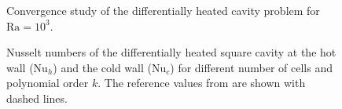 \begin{figure}[tb]
	\centering
	\pgfplotsset{width=0.34\textwidth, compat=1.3}
	\caption{Convergence study of the differentially heated cavity problem for $\text{Ra} = 10^3$.}\label{fig:ConvergenceDHC}
\end{figure}
\begin{figure}[tb]
	\centering
	\caption[Nusselt numbers of the differentially heated square cavity at the hot wall ($\text{Nu}_h$) and the cold wall ($\text{Nu}_c$) for different number of cells and polynomial order $k$.]{Nusselt numbers of the differentially heated square cavity at the hot wall ($\text{Nu}_h$) and the cold wall ($\text{Nu}_c$) for different number of cells and polynomial order $k$. The reference values from \textcite{vierendeelsBenchmarkSolutionsNatural2003} are shown with dashed lines.}\label{fig:NusseltStudy}
\end{figure}
\FloatBarrier

